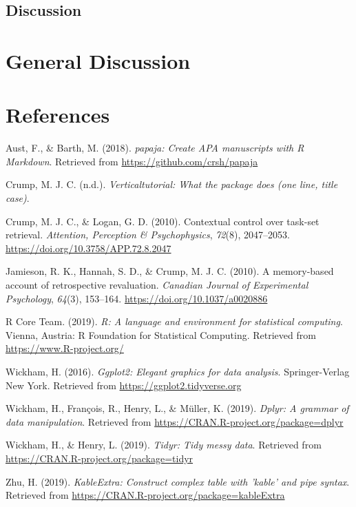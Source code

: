 \documentclass[
  english,
  man]{apa6}
\newlength{\cslhangindent}
\newenvironment{cslreferences}%
  {\setlength{\parindent}{0pt}%
  \everypar{\setlength{\hangindent}{\cslhangindent}}\ignorespaces}%
  {\par}
\begin{document}
\hypertarget{discussion}{%
\subsection{Discussion}\label{discussion}}

\hypertarget{general-discussion}{%
\section{General Discussion}\label{general-discussion}}

\newpage

\hypertarget{references}{%
\section{References}\label{references}}

\begingroup
\setlength{\parindent}{-0.5in}
\setlength{\leftskip}{0.5in}

\hypertarget{refs}{}
\begin{cslreferences}
\leavevmode\hypertarget{ref-R-papaja}{}%
Aust, F., \& Barth, M. (2018). \emph{papaja: Create APA manuscripts with R Markdown}. Retrieved from \url{https://github.com/crsh/papaja}

\leavevmode\hypertarget{ref-R-verticaltutorial}{}%
Crump, M. J. C. (n.d.). \emph{Verticaltutorial: What the package does (one line, title case)}.

\leavevmode\hypertarget{ref-crumpContextualControlTaskset2010}{}%
Crump, M. J. C., \& Logan, G. D. (2010). Contextual control over task-set retrieval. \emph{Attention, Perception \& Psychophysics}, \emph{72}(8), 2047--2053. \url{https://doi.org/10.3758/APP.72.8.2047}

\leavevmode\hypertarget{ref-jamiesonMemorybasedAccountRetrospective2010}{}%
Jamieson, R. K., Hannah, S. D., \& Crump, M. J. C. (2010). A memory-based account of retrospective revaluation. \emph{Canadian Journal of Experimental Psychology}, \emph{64}(3), 153--164. \url{https://doi.org/10.1037/a0020886}

\leavevmode\hypertarget{ref-R-base}{}%
R Core Team. (2019). \emph{R: A language and environment for statistical computing}. Vienna, Austria: R Foundation for Statistical Computing. Retrieved from \url{https://www.R-project.org/}

\leavevmode\hypertarget{ref-R-ggplot2}{}%
Wickham, H. (2016). \emph{Ggplot2: Elegant graphics for data analysis}. Springer-Verlag New York. Retrieved from \url{https://ggplot2.tidyverse.org}

\leavevmode\hypertarget{ref-R-dplyr}{}%
Wickham, H., François, R., Henry, L., \& Müller, K. (2019). \emph{Dplyr: A grammar of data manipulation}. Retrieved from \url{https://CRAN.R-project.org/package=dplyr}

\leavevmode\hypertarget{ref-R-tidyr}{}%
Wickham, H., \& Henry, L. (2019). \emph{Tidyr: Tidy messy data}. Retrieved from \url{https://CRAN.R-project.org/package=tidyr}

\leavevmode\hypertarget{ref-R-kableExtra}{}%
Zhu, H. (2019). \emph{KableExtra: Construct complex table with 'kable' and pipe syntax}. Retrieved from \url{https://CRAN.R-project.org/package=kableExtra}
\end{cslreferences}

\endgroup
\end{document}
